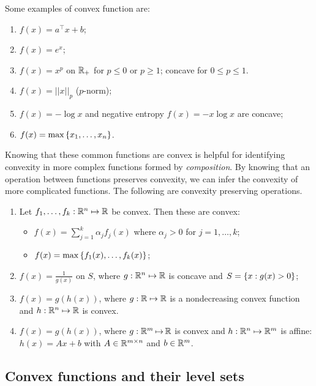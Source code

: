 Some examples of convex function are:
%
\begin{enumerate}
	\item $f(x) = a^\top x + b$;
	\item $f(x) = e^x$;
	\item $f(x) = x^p$ on $\mathbb{R}_+$ for $ p \leq 0$ or $p \geq 1$; concave for $0 \leq p \leq 1$.
	\item $f(x) = ||x||_p$ ($p$-norm);
	\item $f(x) = -\log x $ and negative entropy $f(x) = -x\log x $ are concave;
	\item $f(x) = \max\left\{ x_1, \dots, x_n \right \}$.
\end{enumerate}
%
Knowing that these common functions are convex is helpful for identifying convexity in more complex functions formed by \emph{composition}. By knowing that an operation between functions preserves convexity, we can infer the convexity of more complicated functions. The following are convexity preserving operations.
%
\begin{enumerate}
	\item Let $f_1, \dots, f_k : \mathbb{R}^n \mapsto \mathbb{R}$ be convex. Then these are convex:
	\begin{itemize}
		\item $f(x) = \sum_{j=1}^k\alpha_j f_j(x)$ where $\alpha_j >0$ for $j=1,\dots,k$;
		\item $f(x) = \max\left\{ f_1(x), \dots, f_k(x) \right \}$;
	\end{itemize}
		\item $f(x) = \frac{1}{g(x)}$ on $S$, where $g:\mathbb{R}^n \mapsto \mathbb{R}$ is concave and $S = \left\{ x : g(x) > 0 \right \}$; 
		\item $f(x) = g(h(x))$, where $g: \mathbb{R} \mapsto \mathbb{R}$ is a nondecreasing convex function and $h:\mathbb{R}^n \mapsto \mathbb{R}$ is convex.
	\item $f(x) = g(h(x))$,\hspace{-1pt} where $g: \mathbb{R}^m\hspace{-1pt} \mapsto\hspace{-1pt} \mathbb{R}$ is convex and\hspace{-1pt} $h:\mathbb{R}^n \mapsto \mathbb{R}^m$ is affine: $h(x) = Ax + b$ with $A\in \mathbb{R}^{m\times n}$ and $b\in \mathbb{R}^m$.
\end{enumerate}


\subsection{Convex functions and their level sets}


